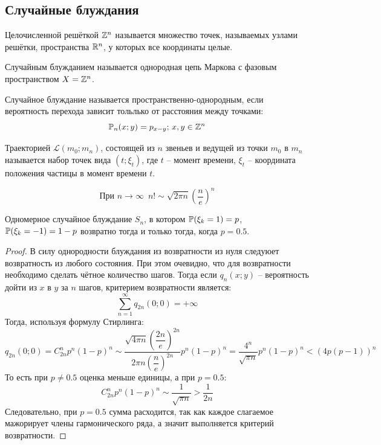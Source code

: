 \documentclass[12pt]{article}
\begin{document}
\subsection{Случайные блуждания}

\begin{definition}
    Целочисленной решёткой $\mathbb{Z}^n$ называется множество точек, называемых узлами решётки, пространства $\mathbb{R}^n$, у которых все координаты целые.
\end{definition}
\begin{definition}
    Случайным блужданием называется однородная цепь Маркова с фазовым пространством $X=\mathbb{Z}^n$.
\end{definition}
\begin{definition}
    Случайное блуждание называется пространственно-однородным, если вероятность перехода зависит тольлько от расстояния между точками:
    $$\mathbb{P}_n(x;y)=p_{x-y};\,x,y\in\mathbb{Z}^n$$
\end{definition}
\begin{definition}
    Траекторией $\mathcal{L}(m_0;m_n)$, состоящей из $n$ звеньев и ведущей из точки $m_0$ в $m_n$ называется набор точек вида $(t;\xi_t)$, где $t$ -- момент времени, $\xi_t$ -- координата положения частицы в момент времени $t$.
\end{definition}
\begin{theorem}
    $$\text{При }n\to\infty\enspace n!\sim \sqrt{2\pi n}\left(\frac{n}{e}\right)^n$$
\end{theorem}
\begin{theorem}
    Одномерное случайное блуждание $S_n$, в котором $\mathbb{P}(\xi_k=1)=p$, $\mathbb{P}(\xi_k=-1)=1-p$ возвратно тогда и только тогда, когда $p=\num{0.5}$.
\end{theorem}
\begin{proof}
    В силу однородности блуждания из возвратности из нуля следуюет возвратность из любого состояния. При этом очевидно, что для возвратности необходимо сделать чётное количество шагов. Тогда если $q_n(x;y)$ -- вероятность дойти из $x$ в $y$ за $n$ шагов, критерием возвратности является:
    $$\sum_{n=1}^\infty q_{2n}(0;0)=+\infty$$
    Тогда, используя формулу Стирлинга:
    $$q_{2n}(0;0)=C_{2n}^np^n(1-p)^n\sim \frac{\sqrt{4\pi n}\left(\dfrac{2n}{e}\right)^{2n}}{2\pi n\left(\dfrac{n}{e}\right)^{2n}}p^n(1-p)^n=\frac{4^n}{\sqrt{\pi n}}p^n(1-p)^n<(4p(p-1))^n$$
    То есть при $p\neq\num{0.5}$ оценка меньше единицы, а при $p=\num{0.5}$:
    $$C_{2n}^np^n(1-p)^n\sim \frac{1}{\sqrt{\pi n}}>\frac{1}{2n}$$
    Следовательно, при $p=\num{0.5}$ сумма расходится, так как каждое слагаемое мажорирует члены гармонического ряда, а значит выполняется критерий возвратности.
\end{proof}
\end{document}
